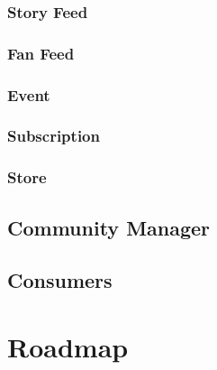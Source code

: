 \documentclass[letterpaper,11pt]{article}
\begin{document}
\subsubsection{Story Feed}

\subsubsection{Fan Feed}

\subsubsection{Event}

\subsubsection{Subscription}

\subsubsection{Store}

\subsection{Community Manager}

\subsection{Consumers}

\section{Roadmap}



\end{document}
